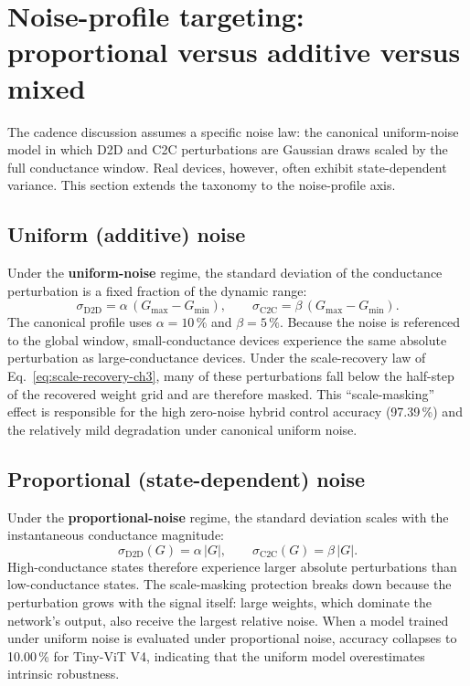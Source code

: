 \section{Noise-profile targeting: proportional versus additive versus mixed}
\label{sec:noise-profile-targeting}

The cadence discussion assumes a specific noise law: the canonical uniform-noise model in which D2D and C2C perturbations are Gaussian draws scaled by the full conductance window. Real devices, however, often exhibit state-dependent variance. This section extends the taxonomy to the noise-profile axis.

\subsection{Uniform (additive) noise}

Under the \textbf{uniform-noise} regime, the standard deviation of the conductance perturbation is a fixed fraction of the dynamic range:
\begin{equation}
    \sigma_{\mathrm{D2D}} = \alpha\,(G_{\max}-G_{\min}), \qquad \sigma_{\mathrm{C2C}} = \beta\,(G_{\max}-G_{\min}).
\end{equation}
The canonical profile uses $\alpha=10\,\%$ and $\beta=5\,\%$. Because the noise is referenced to the global window, small-conductance devices experience the same absolute perturbation as large-conductance devices. Under the scale-recovery law of Eq.~\ref{eq:scale-recovery-ch3}, many of these perturbations fall below the half-step of the recovered weight grid and are therefore masked. This ``scale-masking'' effect is responsible for the high zero-noise hybrid control accuracy (97.39\,\%) and the relatively mild degradation under canonical uniform noise.

\subsection{Proportional (state-dependent) noise}

Under the \textbf{proportional-noise} regime, the standard deviation scales with the instantaneous conductance magnitude:
\begin{equation}
    \sigma_{\mathrm{D2D}}(G) = \alpha\,|G|, \qquad \sigma_{\mathrm{C2C}}(G) = \beta\,|G|.
\end{equation}
High-conductance states therefore experience larger absolute perturbations than low-conductance states. The scale-masking protection breaks down because the perturbation grows with the signal itself: large weights, which dominate the network's output, also receive the largest relative noise. When a model trained under uniform noise is evaluated under proportional noise, accuracy collapses to 10.00\,\% for Tiny-ViT V4, indicating that the uniform model overestimates intrinsic robustness.

